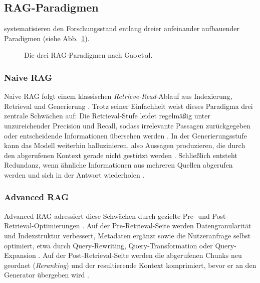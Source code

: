 \subsection{RAG-Paradigmen}
\label{sec:rag-paradigmen}

\textcite[3ff.]{Gao.2024} systematisieren den Forschungsstand entlang dreier aufeinander aufbauender Paradigmen (siehe Abb.~\ref{fig:rag-paradigmen}).

\begin{figure}[htbp]
	\centering
	\resizebox{\textwidth}{!}{}
	\caption{Die drei RAG-Paradigmen nach Gao\,et\,al.}
	\label{fig:rag-paradigmen}
\end{figure}


\subsubsection{Naive RAG}
\label{sec:naive-rag}

Naive RAG folgt einem klassischen \textit{Retrieve-Read}-Ablauf aus Indexierung, Retrieval und Generierung \autocite[3]{Gao.2024}. Trotz seiner Einfachheit weist dieses Paradigma drei zentrale Schwächen auf: Die Retrieval-Stufe leidet regelmäßig unter unzureichender Precision und Recall, sodass irrelevante Passagen zurückgegeben oder entscheidende Informationen übersehen werden \autocite[3]{Gao.2024}. In der Generierungsstufe kann das Modell weiterhin halluzinieren, also Aussagen produzieren, die durch den abgerufenen Kontext gerade nicht gestützt werden \autocite[3]{Gao.2024}. Schließlich entsteht Redundanz, wenn ähnliche Informationen aus mehreren Quellen abgerufen werden und sich in der Antwort wiederholen \autocite[3]{Gao.2024}.

\subsubsection{Advanced RAG}
\label{sec:advanced-rag}

Advanced RAG adressiert diese Schwächen durch gezielte Pre- und Post-Retrieval-Optimierungen \autocite[3f.]{Gao.2024}. Auf der Pre-Retrieval-Seite werden Datengranularität und Indexstruktur verbessert, Metadaten ergänzt sowie die Nutzeranfrage selbst optimiert, etwa durch Query-Rewriting, Query-Trans\-for\-mation oder Query-Expansion \autocite[4]{Gao.2024}. Auf der Post-Retrieval-Seite werden die abgerufenen Chunks neu geordnet (\textit{Reranking}) und der resultierende Kontext komprimiert, bevor er an den Generator übergeben wird \autocite[4]{Gao.2024}.

